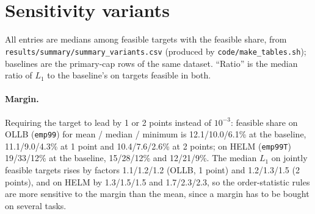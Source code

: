 \documentclass{article}
\begin{document}
\begin{table}[h]
\caption{Feasibility frontier of Table~\ref{tab:T4} with the analysis' 95\% bootstrap intervals over targets for $r^*$ and for ``all feasible up to'' (intervals of a maximum or a prefix are one-sided by construction and describe which targets are in the sample, not noise in the scores). Generated by \texttt{figures/src/tables.py} from \texttt{results/summary/frontier\_*.csv}.}
\label{tab:T4b}
\centering\scriptsize
\resizebox{\linewidth}{!}{}\\[4pt]
\resizebox{\linewidth}{!}{}
\end{table}

\begin{table}[h]
\caption{Rule versus mean on targets feasible under both (primary caps): $n_\text{both}/n_\text{either}$, median ratio of cost(rule) to cost(mean) with 95\% bootstrap interval over targets, and share of jointly feasible targets on which the rule is cheaper. A ratio below 1 means the rule is cheaper; the comparison is restricted to a selected subset (see the first column). $^\dagger$: the 50 best targets only. Generated by \texttt{figures/src/tables.py} from \texttt{results/summary/paired\_*.csv}.}
\label{tab:T6}
\centering\scriptsize
\resizebox{\linewidth}{!}{}\\[4pt]
\resizebox{\linewidth}{!}{}
\end{table}

\section{Sensitivity variants}
\label{app:var}
All entries are medians among feasible targets with the feasible share, from \texttt{results/summary/summary\_variants.csv} (produced by \texttt{code/make\_tables.sh}); baselines are the primary-cap rows of the same dataset. ``Ratio'' is the median ratio of $L_1$ to the baseline's on targets feasible in both.

\paragraph{Margin.} Requiring the target to lead by 1 or 2 points instead of $10^{-3}$: feasible share on OLLB (\texttt{emp99}) for mean / median / minimum is 12.1/10.0/6.1\% at the baseline, 11.1/9.0/4.3\% at 1 point and 10.4/7.6/2.6\% at 2 points; on HELM (\texttt{emp99T}) 19/33/12\% at the baseline, 15/28/12\% and 12/21/9\%. The median $L_1$ on jointly feasible targets rises by factors 1.1/1.2/1.2 (OLLB, 1 point) and 1.2/1.3/1.5 (2 points), and on HELM by 1.3/1.5/1.5 and 1.7/2.3/2.3, so the order-statistic rules are more sensitive to the margin than the mean, since a margin has to be bought on several tasks.
\end{document}
